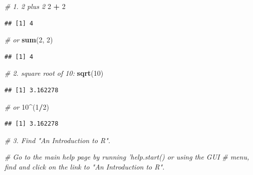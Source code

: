 \documentclass[]{book}
\newenvironment{Shaded}{\begin{snugshade}}{\end{snugshade}}
\newcommand{\CommentTok}[1]{\textcolor[rgb]{0.56,0.35,0.01}{\textit{#1}}}
\newcommand{\DecValTok}[1]{\textcolor[rgb]{0.00,0.00,0.81}{#1}}
\newcommand{\KeywordTok}[1]{\textcolor[rgb]{0.13,0.29,0.53}{\textbf{#1}}}
\newcommand{\NormalTok}[1]{#1}
\newcommand{\OperatorTok}[1]{\textcolor[rgb]{0.81,0.36,0.00}{\textbf{#1}}}
\newcommand{\StringTok}[1]{\textcolor[rgb]{0.31,0.60,0.02}{#1}}
\begin{document}
\begin{Shaded}
\begin{Highlighting}[]
\CommentTok{# 1. 2 plus 2}
\DecValTok{2} \OperatorTok{+}\StringTok{ }\DecValTok{2}
\end{Highlighting}
\end{Shaded}

\begin{verbatim}
## [1] 4
\end{verbatim}

\begin{Shaded}
\begin{Highlighting}[]
\CommentTok{# or}
\KeywordTok{sum}\NormalTok{(}\DecValTok{2}\NormalTok{, }\DecValTok{2}\NormalTok{)}
\end{Highlighting}
\end{Shaded}

\begin{verbatim}
## [1] 4
\end{verbatim}

\begin{Shaded}
\begin{Highlighting}[]
\CommentTok{# 2. square root of 10:}
\KeywordTok{sqrt}\NormalTok{(}\DecValTok{10}\NormalTok{)}
\end{Highlighting}
\end{Shaded}

\begin{verbatim}
## [1] 3.162278
\end{verbatim}

\begin{Shaded}
\begin{Highlighting}[]
\CommentTok{# or}
\DecValTok{10}\OperatorTok{^}\NormalTok{(}\DecValTok{1}\OperatorTok{/}\DecValTok{2}\NormalTok{)}
\end{Highlighting}
\end{Shaded}

\begin{verbatim}
## [1] 3.162278
\end{verbatim}

\begin{Shaded}
\begin{Highlighting}[]
\CommentTok{# 3. Find "An Introduction to R".}

\CommentTok{# Go to the main help page by running 'help.start() or using the GUI}
\CommentTok{# menu, find and click on the link to "An Introduction to R".}
\end{Highlighting}
\end{Shaded}
\end{document}
